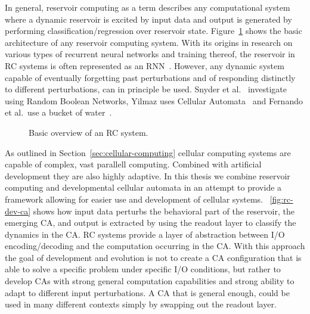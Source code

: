 In general, reservoir computing as a term describes any computational system
where a dynamic reservoir is excited by input data and output is generated by
performing classification/regression over reservoir state.
Figure~\ref{fig:rc-system} shows the basic architecture of any reservoir
computing system. With its origins in research on various types of recurrent
neural networks and training thereof, the reservoir in RC systems is often
represented as an RNN~\cite{Verstraeten2007}. However, any dynamic system
capable of eventually forgetting past perturbations and of responding distinctly
to different perturbations, can in principle be used. Snyder et
al.~\cite{Snyder2013} investigate using Random Boolean Networks, Yilmaz uses
Cellular Automata~\cite{Yilmaz2014} and Fernando et al.\ use a bucket of
water~\cite{Fernando2003}.

\begin{figure}[ht]
  \centering
  \caption[Basic overview of an RC system]{Basic overview of an RC system.}
\label{fig:rc-system}
\end{figure}

As outlined in Section~\ref{sec:cellular-computing} cellular computing systems
are capable of complex, vast parallell computing. Combined with artificial
development they are also highly adaptive. In this thesis we combine reservoir
computing and developmental cellular automata in an attempt to provide a
framework allowing for easier use and development of cellular systems.
\figurename~\ref{fig:rc-dev-ca} shows how input data perturbs the behavioral
part of the reservoir, the emerging CA, and output is extracted by using the
readout layer to classify the dynamics in the CA. RC systems provide a layer of
abstraction between I/O encoding/decoding and the computation occurring in the
CA. With this approach the goal of development and evolution is not to create a
CA configuration that is able to solve a specific problem under specific I/O
conditions, but rather to develop CAs with strong general computation
capabilities and strong ability to adapt to different input perturbations. A CA
that is general enough, could be used in many different contexts simply by
swapping out the readout layer.

